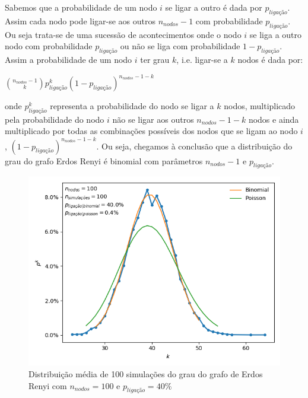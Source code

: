 \documentclass[conference, twocolumn]{IEEEtran}
\theoremstyle{plain}
\theoremstyle{definition}
\theoremstyle{remark}
\begin{document}
Sabemos que a probabilidade de um nodo $i$ se ligar a outro é dada por $p_{ligação}$. Assim cada nodo pode ligar-se aos outros $n_{nodos}-1$ com probabilidade $p_{ligação}$. Ou seja trata-se  de uma sucessão de acontecimentos onde o nodo $i$ se liga a outro nodo com probabilidade $p_{ligação}$ ou não se liga com probabilidade $1-p_{ligação}$.
Assim a probabilidade de um nodo $i$ ter grau $k$, i.e. ligar-se a $k$ nodos é dada por:

\begin{center}
$\binom{n_{nodos}-1}{k}p_{ligação}^{k}{(1-p_{ligação})}^{n_{nodos}-1-k}$
\end{center}

onde $p_{ligação}^{k}$ representa a probabilidade do nodo se ligar a $k$ nodos, multiplicado pela probabilidade do nodo $i$ não se ligar aos outros $n_{nodos}-1-k$ nodos e ainda multiplicado por todas as combinações possíveis dos nodos que se ligam ao nodo $i$, ${(1-p_{ligação})}^{n_{nodos}-1-k}$.
Ou seja, chegamos à conclusão que a distribuição do grau do grafo Erdos Renyi é binomial com parâmetros $n_{nodos}-1$ e $p_{ligação}$.

\begin{figure}[h]
    \centering
    \includegraphics[width=1\linewidth]{images/erdos_renyi_degree_binomial_and_poisson_distributions_low_number_of_initial_nodes.png}
    \caption{\small Distribuição média de 100 simulações do grau do grafo de Erdos Renyi com $n_{nodos}=100$ e $p_{ligação}=40\%$}
    \label{fig:erdos_renyi_degree_binomial_and_poisson_distributions_low_number_of_initial_nodes}
\end{figure}
\end{document}
